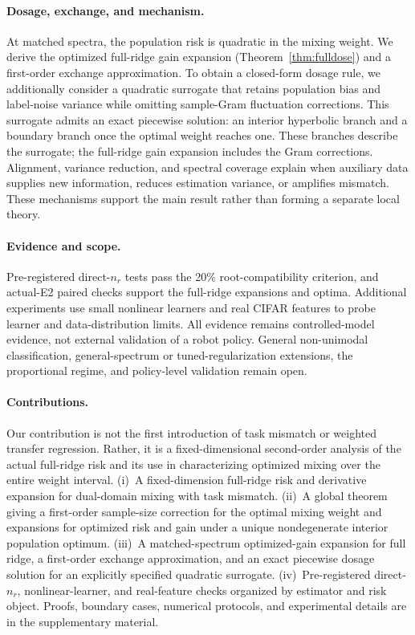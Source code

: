 \paragraph{Dosage, exchange, and mechanism.}
At matched spectra, the population risk is quadratic in the mixing weight. We derive the optimized full-ridge gain expansion (Theorem~\ref{thm:fulldose}) and a first-order exchange approximation. To obtain a closed-form dosage rule, we additionally consider a quadratic surrogate that retains population bias and label-noise variance while omitting sample-Gram fluctuation corrections. This surrogate admits an exact piecewise solution: an interior hyperbolic branch and a boundary branch once the optimal weight reaches one. These branches describe the surrogate; the full-ridge gain expansion includes the Gram corrections.
Alignment, variance reduction, and spectral coverage explain when auxiliary data supplies new information, reduces estimation variance, or amplifies mismatch. These mechanisms support the main result rather than forming a separate local theory.

\paragraph{Evidence and scope.}
Pre-registered direct-$n_r$ tests pass the 20\% root-compatibility criterion, and actual-E2 paired checks support the full-ridge expansions and optima. Additional experiments use small nonlinear learners and real CIFAR features to probe learner and data-distribution limits. All evidence remains controlled-model evidence, not external validation of a robot policy. General non-unimodal classification, general-spectrum or tuned-regularization extensions, the proportional regime, and policy-level validation remain open.

\paragraph{Contributions.}
Our contribution is not the first introduction of task mismatch or weighted transfer regression. Rather, it is a fixed-dimensional second-order analysis of the actual full-ridge risk and its use in characterizing optimized mixing over the entire weight interval.
(i)~A fixed-dimension full-ridge risk and derivative expansion for dual-domain mixing with task mismatch.
(ii)~A global theorem giving a first-order sample-size correction for the optimal mixing weight and expansions for optimized risk and gain under a unique nondegenerate interior population optimum.
(iii)~A matched-spectrum optimized-gain expansion for full ridge, a first-order exchange approximation, and an exact piecewise dosage solution for an explicitly specified quadratic surrogate.
(iv)~Pre-registered direct-$n_r$, nonlinear-learner, and real-feature checks organized by estimator and risk object.
Proofs, boundary cases, numerical protocols, and experimental details are in the supplementary material.
